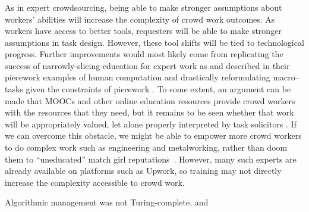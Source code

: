 \documentclass[trackingWork]{subfiles}
\begin{document}
\subsubsection{\implication}
As in expert crowdsourcing, being able to make stronger assumptions about workers' abilities will increase the complexity of crowd work outcomes.
As workers have access to better tools, requesters will be able to make stronger assumptions in task design.
However, these tool shifts will be tied to technological progress.
Further improvements would most likely come from replicating the success of narrowly-slicing education for expert work as \citeauthor{hart2013rise} and \citeauthor{grier2013computers} described in their piecework examples
of human computation \cite{grier2013computers} and drastically reformulating macro--tasks given the constraints of piecework \cite{hart2013rise}.
To some extent, an argument can be made that
MOOCs and other online education resources
provide crowd workers with the resources that they need, but 
it remains to be seen whether that work will be appropriately valued, let alone
properly interpreted by task solicitors
\cite{aguaded2013mooc}.
If we can overcome this obstacle,
we might be able to empower more crowd workers to do complex work such as engineering and metalworking,
rather than doom them to ``uneducated'' match girl reputations~\cite{10.2307/3827491}.
However, many such experts are already available on platforms such as Upwork, so training may not directly increase the complexity accessible to crowd work.


Algorithmic management 
was not Turing-complete, and
\end{document}
